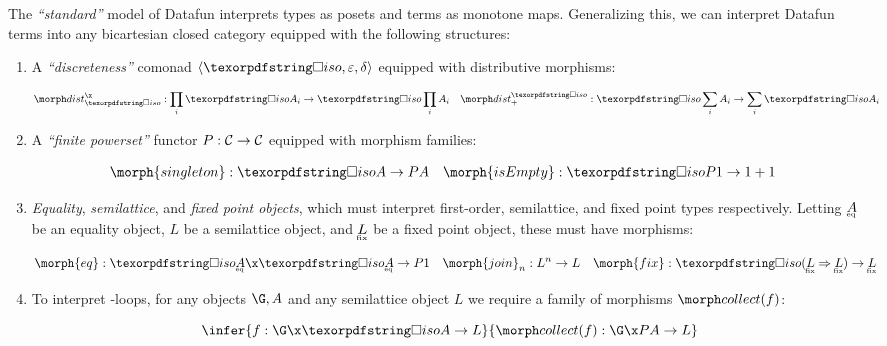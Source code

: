 The \emph{``standard''} model of Datafun interprets types as posets and terms as
monotone maps. Generalizing this, we can interpret Datafun terms into any
bicartesian closed category \catC{} equipped with the following structures:

\begin{enumerate}
\item A \emph{``discreteness''} comonad $\tuple{\disco{}, \varepsilon, \delta}$
  equipped with distributive morphisms:

  \nopagebreak[2]
  \begin{align*}
    \discox &: \prod_i \discof{A_i} \to \disco \prod_i A_i
    &
    \discosum &: \disco \sum_i A_i \to \sum_i \discof{A_i}
  \end{align*}

\item A \emph{``finite powerset''} functor \(P : \mathcal{C} \to \mathcal{C}\) equipped
  with morphism families:

  \nopagebreak[2]
  \begin{align*}
    \morph{singleton} &: \isof A \to \pfinof{A} &
    \morph{isEmpty} &: \discof{\pfinof{\termO}} \to \termO + \termO
  \end{align*}


\item \emph{Equality}, \emph{semilattice}, and \emph{fixed point objects}, which
  must interpret first-order, semilattice, and fixed point types respectively.
  Letting $\eqt A$ be an equality object, $L$ be a semilattice object, and
  $\fixt L$ be a fixed point object, these must have morphisms:

  \nopagebreak[2]
  \begin{align*}
    \morph{eq} &: \isof{\eqt A} \x \isof{\eqt A} \to \pfinof\termO
    &
    \morph{join}_n &: L^n \to L
    &
    \morph{fix} &: \isof{(\expO{\fixt L}{\fixt L})} \to \fixt L
  \end{align*}

\item To interpret -loops, for any objects $\G, A$ and any
  semilattice object $L$ we require a family of morphisms $\pcollect{f}$:

  \nopagebreak[2]
  \[
    \infer{f : \G \x \isof A \to L}
          {\pcollect{f} : \G \x \pfinof{A} \to L}
  \]


\end{enumerate}

